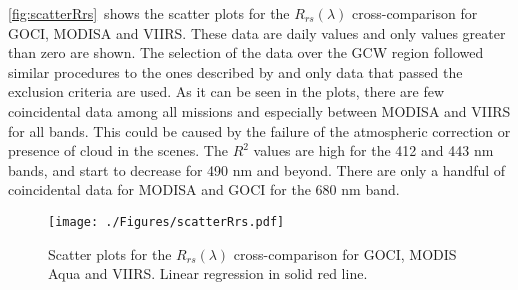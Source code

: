 \documentclass[onecolumn,3p,letterpaper,11pt]{elsarticle}
\begin{document}
% 
% 
% 
\autoref{fig:scatterRrs}~shows the scatter plots for the $R_{rs}(\lambda)$ cross-comparison for GOCI, MODISA and VIIRS. These data are daily values and only values greater than zero are shown. The selection of the data over the GCW region followed similar procedures to the ones described by \cite{Bailey2006} and only data that passed the exclusion criteria are used. As it can be seen in the plots, there are few coincidental data among all missions and especially between MODISA and VIIRS for all bands. This could be caused by the failure of the atmospheric correction or presence of cloud in the scenes. The $R^2$ values are high for the 412 and 443 nm bands, and start to decrease for 490 nm and beyond. There are only a handful of coincidental data for MODISA and GOCI for the 680 nm band.
\begin{figure}[H]
  \centering
  \texttt{[image: ./Figures/scatterRrs.pdf]}
    \caption{Scatter plots for the $R_{rs}(\lambda)$ cross-comparison for GOCI, MODIS Aqua and VIIRS. Linear regression in solid red line. \label{fig:scatterRrs} } 
\end{figure}
\end{document}
